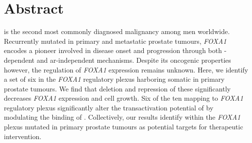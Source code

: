 \section{Abstract}

 is the second most commonly diagnosed malignancy among men worldwide.
Recurrently mutated in primary and metastatic prostate tumours, \emph{FOXA1} encodes a pioneer  involved in disease onset and progression through both -dependent and \gls{ar}-independent mechanisms.
Despite its oncogenic properties however, the regulation of \emph{FOXA1} expression remains unknown.
Here, we identify a set of six  in the \emph{FOXA1} regulatory plexus harboring somatic  in primary prostate tumours.
We find that deletion and repression of these  significantly decreases \emph{FOXA1} expression and  cell growth.
Six of the ten  mapping to \emph{FOXA1} regulatory plexus significantly alter the transactivation potential of  by modulating the binding of .
Collectively, our results identify  within the \emph{FOXA1} plexus mutated in primary prostate tumours as potential targets for therapeutic intervention.
